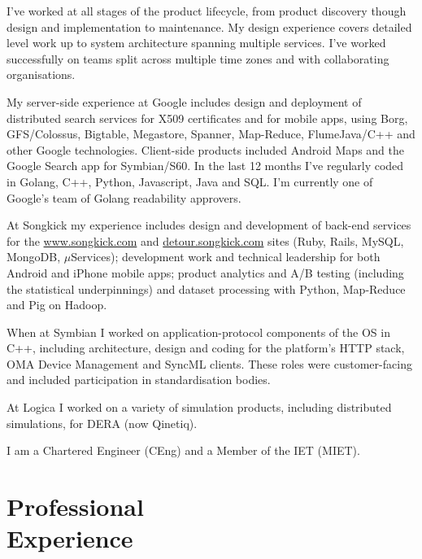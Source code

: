 \documentclass[line]{resume}
\begin{document}
\begin{resume}
    I've worked at all stages of the product lifecycle, from product discovery though design and implementation to
    maintenance. My design experience covers detailed level work up to system architecture spanning multiple services.
    I've worked successfully on teams split across multiple time zones and with collaborating organisations.

    My server-side experience at Google includes design and deployment of distributed search services for X509
    certificates and for mobile apps, using Borg, GFS/Colossus, Bigtable, Megastore, Spanner, Map-Reduce, FlumeJava/C++
    and other Google technologies. Client-side products included Android Maps and the Google Search app for Symbian/S60.
    In the last 12 months I've regularly coded in Golang, C++, Python, Javascript, Java and SQL.  I'm currently one of
    Google's team of Golang readability approvers.

    At Songkick my experience includes design and development of back-end services for the \url{www.songkick.com} and
    \url{detour.songkick.com} sites (Ruby, Rails, MySQL, MongoDB, $\mu$Services); development work and technical leadership
    for both Android and iPhone mobile apps; product analytics and A/B testing (including the statistical underpinnings)
    and dataset processing with Python, Map-Reduce and Pig on Hadoop.

    When at Symbian I worked on application-protocol components of the OS in C++, including architecture, design and
    coding for the platform's HTTP stack, OMA Device Management and SyncML clients.  These roles were customer-facing
    and included participation in standardisation bodies.

    At Logica I worked on a variety of simulation products, including distributed simulations, for DERA (now Qinetiq).

    I am a Chartered Engineer (CEng) and a Member of the IET (MIET).


    \section{\mysidestyle Professional\\Experience}


\end{resume}
\end{document}
